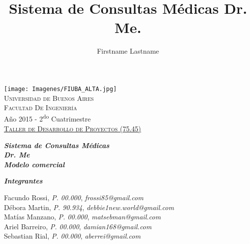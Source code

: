 \documentclass[a4paper,10pt]{article}
\begin{document}
%
%
\pagestyle{fancy}
\renewcommand{\sectionmark}[1]{\markboth{}{\thesection\ \ #1}}
\lhead{}
\chead{}
\rhead{\rightmark}
\lfoot{}
\cfoot{}
\rfoot{\thepage}


%
%

\author{Firstname Lastname}

\begin{titlepage}

\thispagestyle{empty}
\begin{center}
\texttt{[image: Imagenes/FIUBA\_ALTA.jpg]}\\
\large{\textsc{Universidad de Buenos Aires}}\\
\large{\textsc{Facultad De Ingeniería}}\\
\small{Año 2015 - 2\textsuperscript{do} Cuatrimestre}\\
\vspace{1cm}
\Large{\underline{\textsc{Taller de Desarrollo de Proyectos (75.45)}}}
\end{center}



\title{Sistema de Consultas Médicas Dr. Me.}

\begin{center}
\Large{\textit{\bf{Sistema de Consultas Médicas}}}\\
\Large{\textit{\bf{Dr. Me}}}\\
\textit{\bf{Modelo comercial}}
\end{center}

\vspace{1cm}

\raggedright{\Large{\textit{\bf{Integrantes}}}}

\vspace{0.5cm}

\begin{center}
  Facundo Rossi,		\textit{P. 00.000},	\textit{frossi85@gmail.com}		\\
  Débora Martin,		\textit{P. 90.934},	\textit{debbie1new.world@gmail.com}	\\
  Matías Manzano,			\textit{P. 00.000},	\textit{matsebman@gmail.com}		\\
  Ariel Barreiro,		\textit{P. 00.000},	\textit{damian168@gmail.com}		\\
  Sebastian Rial,			\textit{P. 00.000},	\textit{aberrei@gmail.com}		\\
\end{center}

\end{titlepage}
\end{document}
